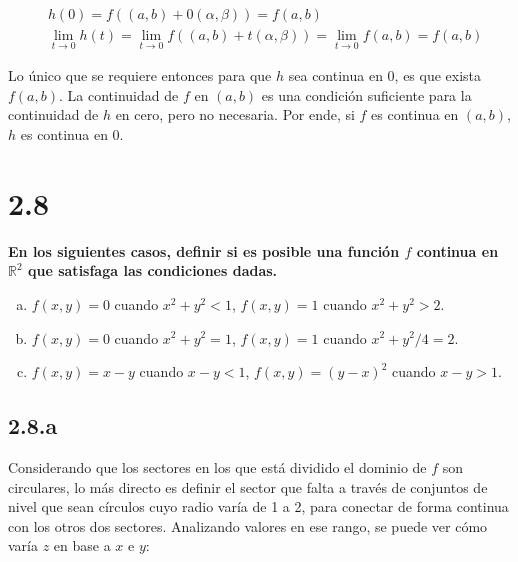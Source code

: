 \documentclass{article}
\renewcommand{\Bbb}{\mathbb}
\begin{document}
\begin{subequations}
\begin{align}
& h(0) = f((a,b) + 0 (\alpha, \beta) ) = f(a,b) \\
& \lim_{t \rightarrow 0} h(t) = \lim_{t \rightarrow 0} f((a,b) + t(\alpha, \beta)) = \lim_{t \rightarrow 0} f(a,b) = f(a,b)
\end{align}
\end{subequations}

Lo único que se requiere entonces para que $h$ sea continua en 0, es que exista $f(a,b)$. La continuidad de $f$ en $(a,b)$ es una condición suficiente para la continuidad de $h$ en cero, pero no necesaria. Por ende, si $f$ es continua en $(a,b)$, $h$ es continua en 0.

\section*{2.8}
\label{sec:2.8}

\textbf{En los siguientes casos, definir si es posible una función $f$ continua en $\Bbb R^2$ que satisfaga las condiciones dadas.}

\begin{enumerate}[(a)]
\bfseries

\item $f(x,y) = 0$ cuando $x^2 + y^2 < 1$, $f(x,y) = 1$ cuando $x^2 + y^2 > 2$. 

\item $f(x,y) = 0$ cuando $x^2 + y^2 = 1$, $f(x,y) = 1$ cuando $x^2 + y^2/4 = 2$. 

\item $f(x,y) = x-y$ cuando $x - y < 1$, $f(x,y) = (y-x)^2$ cuando $x - y > 1$. 

\end{enumerate}

\subsection*{2.8.a}
\label{subsec:2.8.a}

Considerando que los sectores en los que está dividido el dominio de $f$ son circulares, lo más directo es definir el sector que falta a través de conjuntos de nivel que sean círculos cuyo radio varía de 1 a 2, para conectar de forma continua con los otros dos sectores. Analizando valores en ese rango, se puede ver cómo varía $z$ en base a $x$ e $y$:
\end{document}
